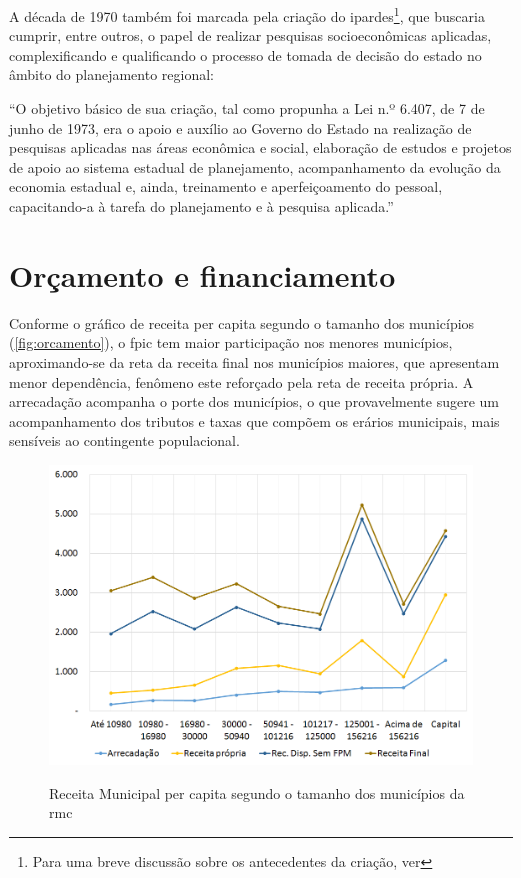 	A década de 1970 também foi marcada pela criação do \gls{ipardes}\footnote{Para uma breve discussão sobre os antecedentes da criação, ver }, que buscaria cumprir, entre outros, o papel de realizar pesquisas socioeconômicas aplicadas, complexificando e qualificando o processo de tomada de decisão do estado no âmbito do planejamento regional:
	
	\begin{citacao}
		``O objetivo básico de sua criação, tal como propunha a Lei n.º 6.407, de 7 de junho de 1973, era o apoio e auxílio ao Governo do Estado na realização de pesquisas aplicadas nas áreas econômica e social, elaboração de estudos e projetos de apoio ao sistema estadual de planejamento, acompanhamento da evolução da economia estadual e, ainda, treinamento e aperfeiçoamento do pessoal, capacitando-a à tarefa do planejamento e à pesquisa aplicada.'' \cite[p. 2]{carleial2003a}
	\end{citacao}
	
	\section{Orçamento e financiamento}
	
	Conforme o gráfico de receita per capita segundo o tamanho dos municípios (\autoref{fig:orcamento}), o \gls{fpic} tem maior participação nos menores municípios, aproximando-se da reta da receita final nos municípios maiores, que apresentam menor dependência, fenômeno este reforçado pela reta de receita própria. A arrecadação acompanha o porte dos municípios, o que provavelmente sugere um acompanhamento dos tributos e taxas que compõem os erários municipais, mais sensíveis ao contingente populacional.
	
	\begin{figure}
		\centering
		\caption{Receita Municipal per capita segundo o tamanho dos municípios da \gls{rmc}}
		\includegraphics[width=1.0\linewidth]{img/orcamento_A}
		\label{fig:orcamento}
	\end{figure}

